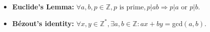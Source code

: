 \begin{itemize}
    \item \textbf{Euclide's Lemma: }$\forall a,b,p \in \mathbb{Z}, p \text{ is prime}, p|ab \Rightarrow p|a \text{ or } p|b$.
    \item \textbf{Bézout's identity: }$\forall x,y \in \mathbb{Z}^*, \exists a,b \in \mathbb{Z} : ax + by = $gcd$(a,b)$.
\end{itemize}